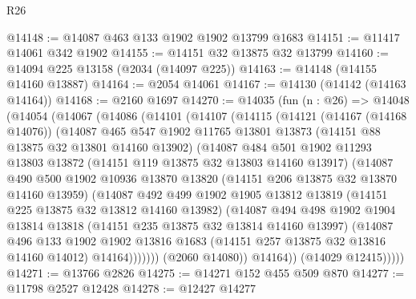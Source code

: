 \begin{lexlean}{R26}
\begin{coremodule}
@14148 := @14087 @463 @133 @1902 @1902 @13799 @1683
@14151 := @11417 @14061 @342 @1902
@14155 := @14151 @32 @13875 @32 @13799
@14160 := @14094 @225 @13158 (@2034 (@14097 @225))
@14163 := @14148 (@14155 @14160 @13887)
@14164 := @2054 @14061
@14167 := @14130 (@14142 (@14163 @14164))
@14168 := @2160 @1697
@14270 := @14035
    (fun (n : @26) =>
    @14048
      (@14054
        (@14067
          (@14086
            (@14101
              (@14107
                (@14115
                  (@14121
                    (@14167 (@14168 @14076))
                    (@14087
                      @465
                      @547
                      @1902
                      @11765
                      @13801
                      @13873
                      (@14151 @88 @13875 @32 @13801 @14160 @13902)
                      (@14087
                        @484
                        @501
                        @1902
                        @11293
                        @13803
                        @13872
                        (@14151 @119 @13875 @32 @13803 @14160 @13917)
                        (@14087
                          @490
                          @500
                          @1902
                          @10936
                          @13870
                          @13820
                          (@14151 @206 @13875 @32 @13870 @14160 @13959)
                          (@14087
                            @492
                            @499
                            @1902
                            @1905
                            @13812
                            @13819
                            (@14151 @225 @13875 @32 @13812 @14160 @13982)
                            (@14087
                              @494
                              @498
                              @1902
                              @1904
                              @13814
                              @13818
                              (@14151 @235 @13875 @32 @13814 @14160 @13997)
                              (@14087
                                @496
                                @133
                                @1902
                                @1902
                                @13816
                                @1683
                                (@14151 @257 @13875 @32 @13816 @14160 @14012)
                                @14164)))))))
                  (@2060 @14080))
                @14164))
            (@14029 @12415)))))
@14271 := @13766 @2826
@14275 := @14271 @152 @455 @509 @870
@14277 := @11798 @2527 @12428
@14278 := @12427 @14277

\end{coremodule}
\end{lexlean}

